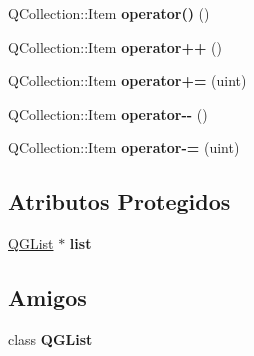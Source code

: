 \begin{DoxyCompactItemize}
\item 
\hypertarget{class_q_g_list_iterator_a3c310601389fba98670bb37b669ee0f6}{Q\-Collection\-::\-Item {\bfseries operator()} ()}\label{class_q_g_list_iterator_a3c310601389fba98670bb37b669ee0f6}

\item 
\hypertarget{class_q_g_list_iterator_a420deca6e5875419f8da2e9febec24f9}{Q\-Collection\-::\-Item {\bfseries operator++} ()}\label{class_q_g_list_iterator_a420deca6e5875419f8da2e9febec24f9}

\item 
\hypertarget{class_q_g_list_iterator_a869cdd7580cace997c32752f254bb4c3}{Q\-Collection\-::\-Item {\bfseries operator+=} (uint)}\label{class_q_g_list_iterator_a869cdd7580cace997c32752f254bb4c3}

\item 
\hypertarget{class_q_g_list_iterator_a0b4723071c92acc4890aab8536fb62f7}{Q\-Collection\-::\-Item {\bfseries operator-\/-\/} ()}\label{class_q_g_list_iterator_a0b4723071c92acc4890aab8536fb62f7}

\item 
\hypertarget{class_q_g_list_iterator_ac348d04dc73c941a7ffbd61b77fd5791}{Q\-Collection\-::\-Item {\bfseries operator-\/=} (uint)}\label{class_q_g_list_iterator_ac348d04dc73c941a7ffbd61b77fd5791}

\end{DoxyCompactItemize}
\subsection*{Atributos Protegidos}
\begin{DoxyCompactItemize}
\item 
\hypertarget{class_q_g_list_iterator_af78edebbd81337b683eaa0856def8360}{\hyperlink{class_q_g_list}{Q\-G\-List} $\ast$ {\bfseries list}}\label{class_q_g_list_iterator_af78edebbd81337b683eaa0856def8360}

\end{DoxyCompactItemize}
\subsection*{Amigos}
\begin{DoxyCompactItemize}
\item 
\hypertarget{class_q_g_list_iterator_a9bfde3c3259271cb86b87bd78b399dd5}{class {\bfseries Q\-G\-List}}\label{class_q_g_list_iterator_a9bfde3c3259271cb86b87bd78b399dd5}

\end{DoxyCompactItemize}


